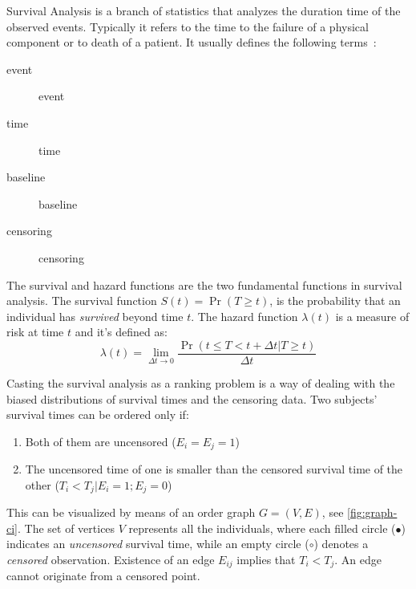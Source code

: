 
Survival Analysis is a branch of statistics that analyzes the duration time of the observed
events. Typically it refers to the time to the failure of a physical component or to death of a
patient. It usually defines the following terms~\cite{neural:survival-analysis}:

\begin{description}
  \item[\Gls{event} ] \glsdesc{event}
  \item[\Gls{time} ] \glsdesc{time}
  \item[\Gls{baseline} ] \glsdesc{baseline}
  \item[\Gls{censoring}] \glsdesc{censoring}
\end{description}

The survival and hazard functions are the two fundamental functions in survival analysis. The
survival function \( S(t) = \Pr(T \ge t) \), is the probability that an individual has
\emph{survived} beyond time \( t \). The hazard function \( \lambda(t) \) is a measure of risk at 
time \( t \) and it's defined as:
~\cite{medical:cox}
\[
  \lambda(t) = \lim_{\Delta t \rightarrow 0}
  \frac{\Pr(t \le T < t + \Delta t | T \ge t)}{\Delta t}
\]

Casting the survival analysis as a ranking problem is a way of dealing with the biased
distributions of survival times and the censoring data. Two subjects' survival times can be 
ordered only if:
\begin{enumerate}[noitemsep, topsep=0pt]
  \item Both of them are uncensored (\( E_i = E_j = 1\))
  \item The uncensored time of one is smaller than the censored survival time of the other
  (\( T_i < T_j | E_i = 1; E_j = 0 \))
\end{enumerate}

This can be visualized by means of an order graph \( G = (V, E) \), see \autoref{fig:graph-ci}.
The set of vertices \( V \) represents all the individuals, where each filled circle 
(\( \bullet \)) indicates an \emph{uncensored} survival time, while an empty circle 
(\( \circ \)) denotes a \emph{censored} observation.
Existence of an edge \( E_{ij} \) implies that \( T_i < T_j \). An edge cannot originate 
from a censored point.

